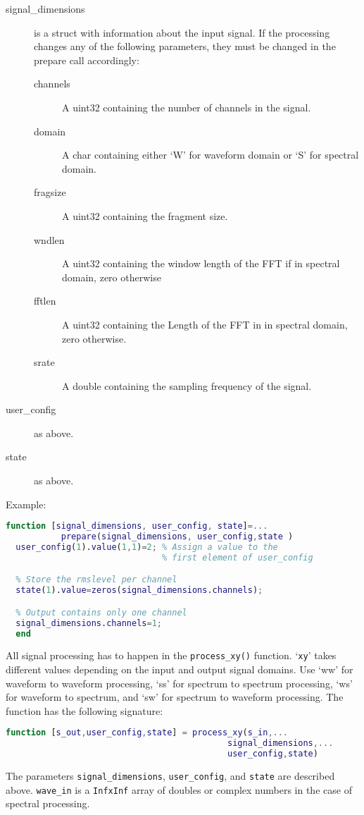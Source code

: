 \documentclass[11pt,a4paper,twoside]{article}
\newcommand{\+}{\discretionary{\mbox{\scriptsize$\hookleftarrow$}}{}{}}
\begin{document}
  \begin{description}
  \item[signal\_dimensions] is a struct with information about the input signal.
    If the processing changes any of the following parameters,
    they must be changed in the prepare call accordingly:
    \begin{description}
    \item[channels] A uint32 containing the number of channels in the signal.
    \item[domain] A char containing either `W' for waveform domain or `S' for spectral domain. 
    \item[fragsize] A uint32 containing the fragment size.
    \item[wndlen] A uint32 containing the window length of the FFT if in spectral domain, zero otherwise
    \item[fftlen] A uint32 containing the Length of the FFT in in spectral domain, zero otherwise.
    \item[srate] A double containing the sampling frequency of the signal.
    \end{description}
  \item[user\_config] as above.
  \item[state] as above.
  \end{description}
  Example:
\begin{lstlisting}[language=Matlab]
  function [signal_dimensions, user_config, state]=...
           prepare(signal_dimensions, user_config,state )
  user_config(1).value(1,1)=2; % Assign a value to the
                               % first element of user_config

  % Store the rmslevel per channel 
  state(1).value=zeros(signal_dimensions.channels); 

  % Output contains only one channel
  signal_dimensions.channels=1; 
  end
\end{lstlisting}
  All signal processing has to happen in the \texttt{process\_xy()} function. `\texttt{xy}'  takes different values
depending on the input and output signal domains. Use `ww' for waveform to
waveform processing,  `ss' for spectrum to spectrum processing,  `ws' for waveform
to spectrum, and `sw' for spectrum to waveform processing. The function has the following signature:
\begin{lstlisting}[language=Matlab]
  function [s_out,user_config,state] = process_xy(s_in,...
                                            signal_dimensions,...
                                            user_config,state)
\end{lstlisting}
The parameters \texttt{signal\_dimensions}, \texttt{user\_config}, and
\texttt{state} are described above.
\texttt{wave\_in} is a \texttt{InfxInf} array of doubles or complex numbers in
the case of spectral processing.
\end{document}
